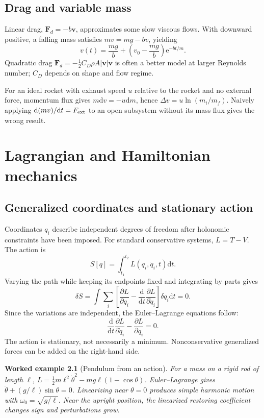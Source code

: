\documentclass[11pt,oneside]{book}
\newcommand{\dd}{\mathrm{d}}
\newcommand{\ee}{\mathrm{e}}
\newcommand{\vect}[1]{\boldsymbol{#1}}
\newcommand{\pd}[2]{\frac{\partial #1}{\partial #2}}
\newcommand{\od}[2]{\frac{\dd #1}{\dd #2}}
\theoremstyle{reviewstyle}
\newtheorem{example}{Worked example}[chapter]
\begin{document}
\section{Drag and variable mass}
Linear drag, $\vect F_d=-b\vect v$, approximates some slow viscous flows. With downward positive, a falling mass satisfies $m\dot v=mg-bv$, yielding
\begin{equation}
v(t)=\frac{mg}{b}+\left(v_0-\frac{mg}{b}\right)\ee^{-bt/m}.
\end{equation}
Quadratic drag $\vect F_d=-\tfrac12C_D\rho A|\vect v|\vect v$ is often a better model at larger Reynolds number; $C_D$ depends on shape and flow regime.

For an ideal rocket with exhaust speed $u$ relative to the rocket and no external force, momentum flux gives $m\dd v=-u\dd m$, hence $\Delta v=u\ln(m_i/m_f)$. Naively applying $\dd(mv)/\dd t=F_{\rm ext}$ to an open subsystem without its mass flux gives the wrong result.

\chapter{Lagrangian and Hamiltonian mechanics}
\section{Generalized coordinates and stationary action}
Coordinates $q_i$ describe independent degrees of freedom after holonomic constraints have been imposed. For standard conservative systems, $L=T-V$. The action is
\begin{equation}
S[q]=\int_{t_1}^{t_2}L(q_i,\dot q_i,t)\dd t.
\end{equation}
Varying the path while keeping its endpoints fixed and integrating by parts gives
\begin{equation}
\delta S=\int\sum_i\left[\pd{L}{q_i}-\od{}{t}\pd{L}{\dot q_i}\right]\delta q_i\dd t=0.
\end{equation}
Since the variations are independent, the Euler--Lagrange equations follow:
\begin{equation}\boxed{\od{}{t}\pd{L}{\dot q_i}-\pd{L}{q_i}=0.}\end{equation}
The action is stationary, not necessarily a minimum. Nonconservative generalized forces can be added on the right-hand side.
\begin{example}[Pendulum from an action]
For a mass on a rigid rod of length $\ell$,
$L=\tfrac12m\ell^2\dot\theta^2-mg\ell(1-\cos\theta)$.
Euler--Lagrange gives $\ddot\theta+(g/\ell)\sin\theta=0$. Linearizing near $\theta=0$ produces simple harmonic motion with $\omega_0=\sqrt{g/\ell}$. Near the upright position, the linearized restoring coefficient changes sign and perturbations grow.
\end{example}
\end{document}
